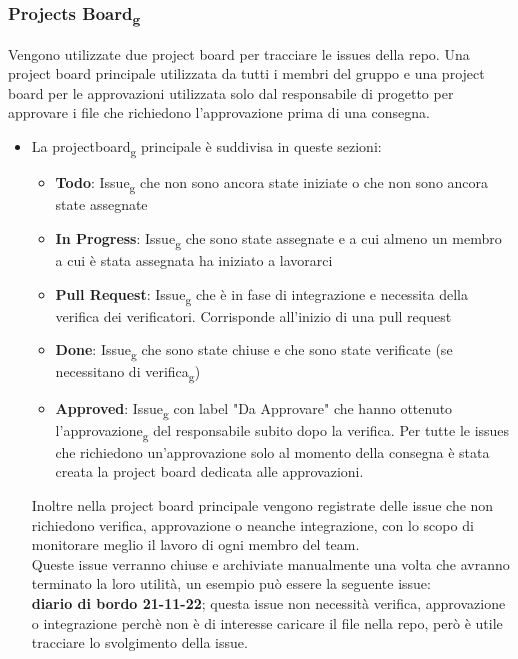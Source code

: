 \subsubsection{Projects Board\textsubscript{g}}
Vengono utilizzate due project board per tracciare le issues della repo.
Una project board principale utilizzata da tutti i membri del gruppo e una project board per le approvazioni utilizzata solo dal responsabile di progetto per approvare i file che richiedono l'approvazione prima di una consegna.

\begin{itemize}
	\item La projectboard\textsubscript{g} principale è suddivisa in queste sezioni:
	\begin{itemize}
		\item \textbf{Todo}: Issue\textsubscript{g} che non sono ancora state iniziate o che non sono ancora state assegnate
		\item \textbf{In Progress}: Issue\textsubscript{g} che sono state assegnate e a cui almeno un membro a cui è stata assegnata ha iniziato a lavorarci
		\item \textbf{Pull Request}: Issue\textsubscript{g} che è in fase di integrazione e necessita della verifica dei verificatori. Corrisponde all'inizio di una pull request
		\item \textbf{Done}: Issue\textsubscript{g} che sono state chiuse e che sono state verificate (se necessitano di verifica\textsubscript{g})
		\item \textbf{Approved}: Issue\textsubscript{g} con label "Da Approvare" che hanno ottenuto l'approvazione\textsubscript{g} del responsabile subito dopo la verifica.
		Per tutte le issues che richiedono un'approvazione solo al momento della consegna è stata creata la project board dedicata alle approvazioni.
	\end{itemize}
	Inoltre nella project board principale vengono registrate delle issue che non richiedono verifica, approvazione o neanche integrazione, con lo scopo di monitorare meglio il lavoro di ogni membro del team.\\
Queste issue verranno chiuse e archiviate manualmente una volta che avranno terminato la loro utilità, un esempio può essere la seguente issue:\\
\textbf{diario di bordo 21-11-22}; questa issue non necessità verifica, approvazione o integrazione perchè non è di interesse caricare il file nella repo, però è utile tracciare lo svolgimento della issue.


\end{itemize}
